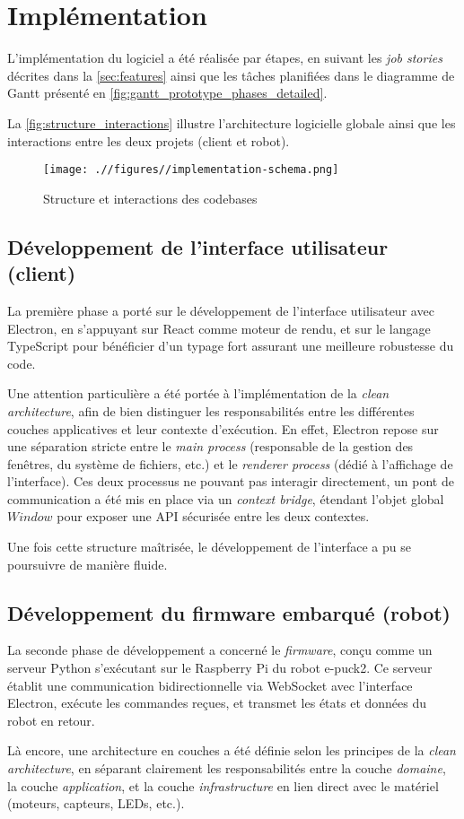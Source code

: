 \section{Implémentation}

L’implémentation du logiciel a été réalisée par étapes, en suivant les \textit{job stories} décrites dans la \autoref{sec:features} ainsi que les tâches planifiées dans le diagramme de Gantt présenté en \autoref{fig:gantt_prototype_phases_detailed}.

La \autoref{fig:structure_interactions} illustre l’architecture logicielle globale ainsi que les interactions entre les deux projets (client et robot).

\begin{figure}[H]
    \centering
    \texttt{[image: .//figures//implementation-schema.png]}
    \caption{\label{fig:structure_interactions} Structure et interactions des codebases}
\end{figure}

\subsection{Développement de l'interface utilisateur (client)}

La première phase a porté sur le développement de l’interface utilisateur avec Electron, en s’appuyant sur React comme moteur de rendu, et sur le langage TypeScript pour bénéficier d’un typage fort assurant une meilleure robustesse du code.

Une attention particulière a été portée à l’implémentation de la \textit{clean architecture}, afin de bien distinguer les responsabilités entre les différentes couches applicatives et leur contexte d’exécution.
En effet, Electron repose sur une séparation stricte entre le \textit{main process} (responsable de la gestion des fenêtres, du système de fichiers, etc.) et le \textit{renderer process} (dédié à l’affichage de l’interface).
Ces deux processus ne pouvant pas interagir directement, un pont de communication a été mis en place via un \textit{context bridge}, étendant l’objet global $Window$ pour exposer une API sécurisée entre les deux contextes.

Une fois cette structure maîtrisée, le développement de l’interface a pu se poursuivre de manière fluide.

\subsection{Développement du firmware embarqué (robot)}

La seconde phase de développement a concerné le \textit{firmware}, conçu comme un serveur Python s’exécutant sur le Raspberry Pi du robot e-puck2. 
Ce serveur établit une communication bidirectionnelle via WebSocket avec l’interface Electron, exécute les commandes reçues, et transmet les états et données du robot en retour.

Là encore, une architecture en couches a été définie selon les principes de la \textit{clean architecture}, en séparant clairement les responsabilités entre la couche \textit{domaine}, la couche \textit{application}, et la couche \textit{infrastructure} en lien direct avec le matériel (moteurs, capteurs, LEDs, etc.).
